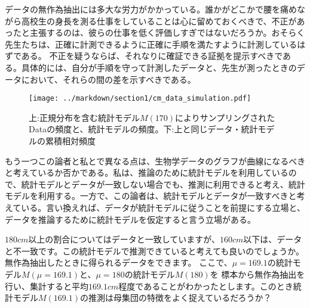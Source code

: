 \documentclass[a4paper,11pt,dvipdfmx]{jsarticle}
\begin{document}
データの無作為抽出には多大な労力がかかっている。誰かがどこかで腰を痛めながら高校生の身長を測る仕事をしていることは心に留めておくべきで、不正があったと主張するのは、彼らの仕事を低く評価しすぎではないだろうか。おそらく先生たちは、正確に計測できるように正確に手順を満たすように計測しているはずである。
不正を疑うならば、それなりに確証できる証拠を提示すべきである。具体的には、自分が手順を守って計測したデータと、先生が測ったときのデータにおいて、それらの間の差を示すべきである。

 \begin{figure}
\begin{center}
    \texttt{[image: ../markdown/section1/cm\_data\_simulation.pdf]}
    \caption{上:正規分布を含む統計モデル$M(170)$によりサンプリングされたDataの頻度と、統計モデルの頻度。下:上と同じデータ・統計モデルの累積相対頻度}
    \label{fig:simulation_height_men}
\end{center}
\end{figure}


もう一つこの論者と私とで異なる点は、生物学データのグラフが曲線になるべきと考えているか否かである。私は、推論のために統計モデルを利用しているので、統計モデルとデータが一致しない場合でも、推測に利用できると考え、統計モデルを利用する。一方で、この論者は、統計モデルとデータが一致すべきと考えている。言い換えれば、データが統計モデルに従うことを前提にする立場と、データを推論するために統計モデルを仮定すると言う立場がある。

$180cm$以上の割合についてはデータと一致していますが、$160cm$以下は、データと不一致です。この統計モデルで推測できていると考えても良いのでしょうか。
無作為抽出したときに得られるデータをできます。
ここで、$\mu=169.1$の統計モデル$M(\mu=169.1)$と、$\mu=180$の統計モデル$M(180)$を
標本から無作為抽出を行い、集計すると平均$169.1cm$程度であることがわかったとします。このとき統計モデル$M(169.1)$の推測は母集団の特徴をよく捉えているだろうか？
\fi 
\end{document}
